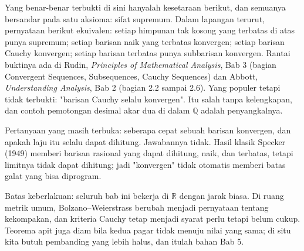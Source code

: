 \begin{untukpeneliti}
Yang benar-benar terbukti di sini hanyalah kesetaraan berikut, dan semuanya
bersandar pada satu aksioma: sifat supremum. Dalam lapangan terurut, pernyataan
berikut ekuivalen: setiap himpunan tak kosong yang terbatas di atas punya
supremum; setiap barisan naik yang terbatas konvergen; setiap barisan Cauchy
konvergen; setiap barisan terbatas punya subbarisan konvergen. Rantai buktinya ada
di Rudin, \emph{Principles of Mathematical Analysis}, Bab 3 (bagian Convergent
Sequences, Subsequences, Cauchy Sequences) dan Abbott, \emph{Understanding
Analysis}, Bab 2 (bagian 2.2 sampai 2.6). Yang populer tetapi tidak terbukti:
"barisan Cauchy selalu konvergen". Itu salah tanpa kelengkapan, dan contoh
pemotongan desimal akar dua di dalam $\mathbb{Q}$ adalah penyangkalnya.

Pertanyaan yang masih terbuka: seberapa cepat sebuah barisan konvergen, dan apakah
laju itu selalu dapat dihitung. Jawabannya tidak. Hasil klasik Specker (1949)
memberi barisan rasional yang dapat dihitung, naik, dan terbatas, tetapi limitnya
tidak dapat dihitung; jadi "konvergen" tidak otomatis memberi batas galat yang bisa
diprogram.

Batas keberlakuan: seluruh bab ini bekerja di $\mathbb{R}$ dengan jarak biasa.
Di ruang metrik umum, Bolzano--Weierstrass berubah menjadi pernyataan tentang
kekompakan, dan kriteria Cauchy tetap menjadi syarat perlu tetapi belum cukup.
Teorema apit juga diam bila kedua pagar tidak menuju nilai yang sama; di situ kita
butuh pembanding yang lebih halus, dan itulah bahan Bab 5.
\end{untukpeneliti}

